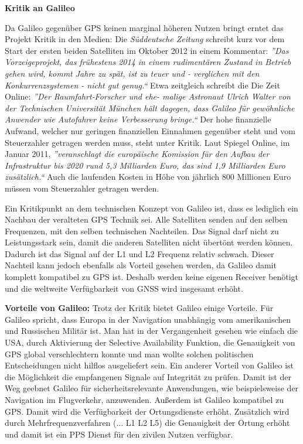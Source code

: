 \documentclass[letterpaper,11pt,ngerman]{andi}
\begin{document}
\textbf{Kritik an Galileo}

Da Galileo gegenüber GPS keinen marginal höheren Nutzen bringt erntet das
Projekt Kritik in den Medien: Die \emph{Süddeutsche Zeitung} schreibt kurz vor dem Start der ersten beiden Satelliten im Oktober 2012 in einem Kommentar: \emph{”Das Vorzeigeprojekt, das frühestens 2014 in einem rudimentären Zustand in Betrieb gehen wird, kommt Jahre zu spät, ist zu teuer und - verglichen mit den Konkurrenzsystemen - nicht gut genug.“} \cite{galileo_fail} Etwa zeitgleich schreibt die Die Zeit Online: \emph{”Der Raumfahrt-Forscher und ehe- malige Astronaut Ulrich Walter von der Technischen Universität München hält dagegen, dass Galileo für gewöhnliche Anwender wie Autofahrer keine Verbesserung bringe.“} \cite{galileo_start} Der hohe finanzielle Aufwand, welcher nur geringen finanziellen Einnahmen gegenüber steht und vom Steuerzahler getragen werden muss, steht unter Kritik. Laut Spiegel Online, im Januar 2011, \emph{”veranschlagt die europäische Komission für den Aufbau der Infrastruktur bis 2020 rund 5,3 Milliarden Euro, das sind 1,9 Milliarden Euro zusätzlich.“} \cite{gal_exp} Auch die laufenden Kosten in Höhe von jährlich 800 Millionen Euro müssen vom Steuerzahler getragen werden.

Ein Kritikpunkt an dem technischen Konzept von Galileo ist, dass es lediglich ein Nachbau der veralteten GPS Technik sei. Alle Satelliten senden auf den selben Frequenzen, mit den selben technischen Nachteilen. Das Signal darf nicht zu Leistungsstark sein, damit die anderen Satelliten nicht übertönt werden können. Dadurch ist das Signal auf der L1 und L2 Frequenz relativ schwach. Dieser Nachteil kann jedoch ebenfalls als Vorteil gesehen werden, da Galileo damit komplett kompatibel zu GPS ist. Deshalb werden keine eigenen Receiver benötigt und die weltweite Verfügbarkeit von GNSS wird insgesamt erhöht.

\textbf{Vorteile von Galileo:}
Trotz der Kritik bietet Galileo einige Vorteile. Für Galileo spricht, dass Europa in der Navigation unabhängig vom amerikanischen und Russischen Militär ist. Man hat in der Vergangenheit gesehen wie einfach die USA, durch Aktivierung der Selective Availability Funktion, die Genauigkeit von GPS global verschlechtern konnte und man wollte solchen politischen Entscheidungen nicht hilflos ausgeliefert sein. Ein anderer Vorteil von Galileo ist die Möglichkeit die empfangenen Signale auf Integrität zu prüfen. Damit ist der Weg geebnet Galileo für sicherheitsrelevante Anwendungen, wie beispielsweise der Navigation im Flugverkehr, anzuwenden. Außerdem ist Galileo kompatibel zu GPS. Damit wird die Verfügbarkeit der Ortungsdienste erhöht. Zusätzlich wird durch Mehrfrequenzverfahren (... L1 L2 L5) die Genauigkeit der Ortung erhöht und damit ist ein PPS Dienst für den zivilen Nutzen verfügbar.
\end{document}
